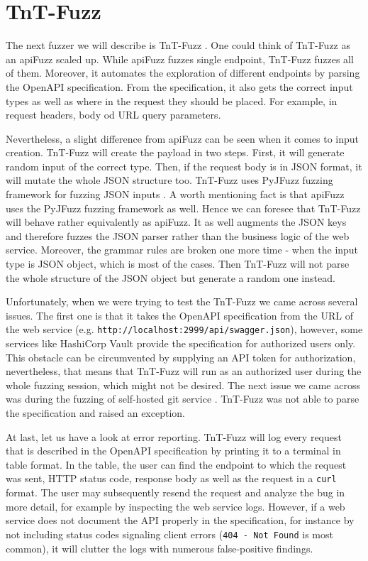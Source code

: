\section{TnT-Fuzz}
\label{sec:tnt-fuzz}
The next fuzzer we will describe is TnT-Fuzz \cite{tntFuzzer2020github}. One could think of  TnT-Fuzz as an apiFuzz scaled up. While apiFuzz fuzzes single endpoint, TnT-Fuzz fuzzes all of them. Moreover, it automates the exploration of different endpoints by parsing the OpenAPI specification. From the specification, it also gets the correct input types as well as where in the request they should be placed. For example, in request headers, body od URL query parameters.

Nevertheless, a slight difference from apiFuzz can be seen when it comes to input creation. TnT-Fuzz will create the payload in two steps. First, it will generate random input of the correct type. Then, if the request body is in JSON format, it will mutate the whole JSON structure too. TnT-Fuzz uses PyJFuzz fuzzing framework for fuzzing JSON inputs \cite{pyjfuzz2020github}. A worth mentioning fact is that apiFuzz uses the PyJFuzz fuzzing framework as well. Hence we can foresee that TnT-Fuzz will behave rather equivalently as apiFuzz. It as well augments the JSON keys and therefore fuzzes the JSON parser rather than the business logic of the web service. Moreover, the grammar rules are broken one more time - when the input type is JSON object, which is most of the cases. Then TnT-Fuzz will not parse the whole structure of the JSON object but generate a random one instead.

Unfortunately, when we were trying to test the TnT-Fuzz we came across several issues. The first one is that it takes the OpenAPI specification from the URL of the web service (e.g. \texttt{http://localhost:2999/api/swagger.json}), however, some services like HashiCorp Vault \cite{vault2020github} provide the specification for authorized users only. This obstacle can be circumvented by supplying an API token for authorization, nevertheless, that means that TnT-Fuzz will run as an authorized user during the whole fuzzing session, which might not be desired. The next issue we came across was during the fuzzing of self-hosted git service \cite{gitea2020web}. TnT-Fuzz was not able to parse the specification and raised an exception.

At last, let us have a look at error reporting. TnT-Fuzz will log every request that is described in the OpenAPI specification by printing it to a terminal in table format. In the table, the user can find the endpoint to which the request was sent, HTTP status code, response body as well as the request in a \texttt{curl} format. The user may subsequently resend the request and analyze the bug in more detail, for example by inspecting the web service logs. However, if a web service does not document the API properly in the specification, for instance by not including status codes signaling client errors (\texttt{404 - Not Found} is most common), it will clutter the logs with numerous false-positive findings.


